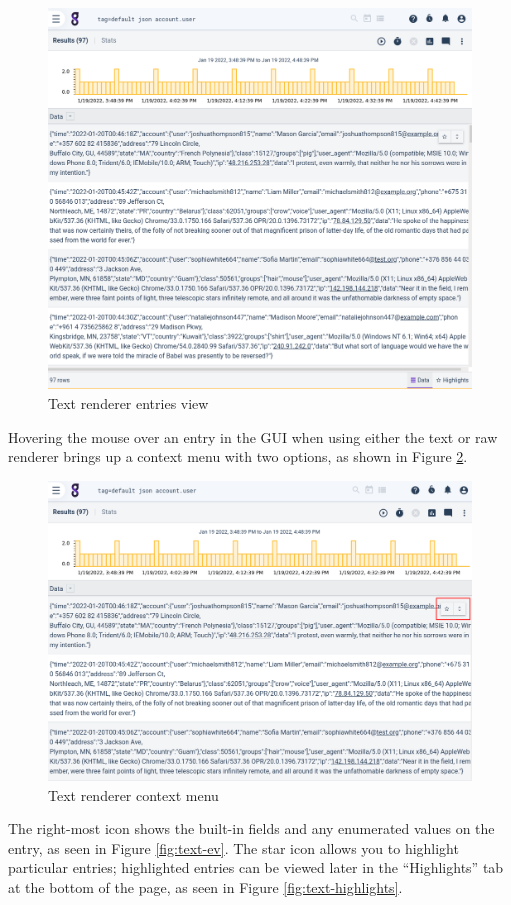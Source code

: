 \begin{figure}
	\includegraphics[width=0.7\linewidth]{images/text-entries.png}
	\caption{Text renderer entries view}
	\label{fig:text-entries}
\end{figure}

Hovering the mouse over an entry in the GUI when using either the text
or raw renderer brings up a context menu with two options, as shown
in Figure \ref{fig:text-context-menu}.

\begin{figure}
	\includegraphics[width=0.7\linewidth]{images/text-context-menu.png}
	\caption{Text renderer context menu}
	\label{fig:text-context-menu}
\end{figure}

The right-most icon shows the built-in fields and any enumerated values on the entry, as seen in Figure \ref{fig:text-ev}. The star icon allows you to highlight particular entries; highlighted entries can be viewed later in the ``Highlights'' tab at the bottom of the page, as seen in Figure \ref{fig:text-highlights}.

